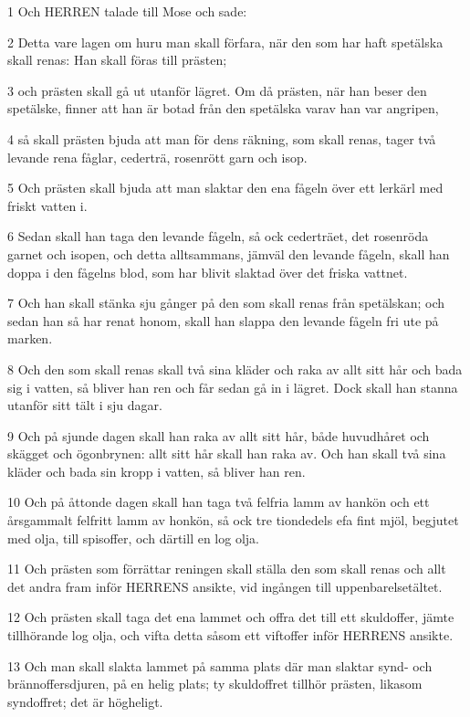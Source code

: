 \par 1 Och HERREN talade till Mose och sade:
\par 2 Detta vare lagen om huru man skall förfara, när den som har haft spetälska skall renas: Han skall föras till prästen;
\par 3 och prästen skall gå ut utanför lägret. Om då prästen, när han beser den spetälske, finner att han är botad från den spetälska varav han var angripen,
\par 4 så skall prästen bjuda att man för dens räkning, som skall renas, tager två levande rena fåglar, cederträ, rosenrött garn och isop.
\par 5 Och prästen skall bjuda att man slaktar den ena fågeln över ett lerkärl med friskt vatten i.
\par 6 Sedan skall han taga den levande fågeln, så ock cederträet, det rosenröda garnet och isopen, och detta alltsammans, jämväl den levande fågeln, skall han doppa i den fågelns blod, som har blivit slaktad över det friska vattnet.
\par 7 Och han skall stänka sju gånger på den som skall renas från spetälskan; och sedan han så har renat honom, skall han slappa den levande fågeln fri ute på marken.
\par 8 Och den som skall renas skall två sina kläder och raka av allt sitt hår och bada sig i vatten, så bliver han ren och får sedan gå in i lägret. Dock skall han stanna utanför sitt tält i sju dagar.
\par 9 Och på sjunde dagen skall han raka av allt sitt hår, både huvudhåret och skägget och ögonbrynen: allt sitt hår skall han raka av. Och han skall två sina kläder och bada sin kropp i vatten, så bliver han ren.
\par 10 Och på åttonde dagen skall han taga två felfria lamm av hankön och ett årsgammalt felfritt lamm av honkön, så ock tre tiondedels efa fint mjöl, begjutet med olja, till spisoffer, och därtill en log olja.
\par 11 Och prästen som förrättar reningen skall ställa den som skall renas och allt det andra fram inför HERRENS ansikte, vid ingången till uppenbarelsetältet.
\par 12 Och prästen skall taga det ena lammet och offra det till ett skuldoffer, jämte tillhörande log olja, och vifta detta såsom ett viftoffer inför HERRENS ansikte.
\par 13 Och man skall slakta lammet på samma plats där man slaktar synd- och brännoffersdjuren, på en helig plats; ty skuldoffret tillhör prästen, likasom syndoffret; det är högheligt.
